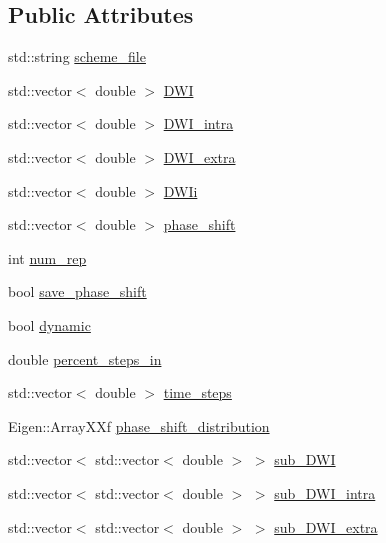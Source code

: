 \subsection*{Public Attributes}
\begin{DoxyCompactItemize}
\item 
std\+::string \hyperlink{class_simulable_sequence_a9898335af9d8f639f65b73eeac8efb53}{scheme\+\_\+file}
\item 
std\+::vector$<$ double $>$ \hyperlink{class_simulable_sequence_a083961d839ed1433206ccbc481996409}{D\+WI}
\item 
std\+::vector$<$ double $>$ \hyperlink{class_simulable_sequence_ac64fb8110b769e180283365567bd4158}{D\+W\+I\+\_\+intra}
\item 
std\+::vector$<$ double $>$ \hyperlink{class_simulable_sequence_a49a24269e364bcd02000ba575acc85ed}{D\+W\+I\+\_\+extra}
\item 
std\+::vector$<$ double $>$ \hyperlink{class_simulable_sequence_a3708afa1322d72b59d3be20b740d107c}{D\+W\+Ii}
\item 
std\+::vector$<$ double $>$ \hyperlink{class_simulable_sequence_a8691c0451c305869064862e30986c34c}{phase\+\_\+shift}
\item 
int \hyperlink{class_simulable_sequence_aa524c45db6c27dd21acacf97d7951ac2}{num\+\_\+rep}
\item 
bool \hyperlink{class_simulable_sequence_aa29f58ae224d92dd467a0845bd207324}{save\+\_\+phase\+\_\+shift}
\item 
bool \hyperlink{class_simulable_sequence_a1de2d00a939f550af1947ae25acc4b97}{dynamic}
\item 
double \hyperlink{class_simulable_sequence_a43e046af3bf6c498a5ad232058de8a90}{percent\+\_\+steps\+\_\+in}
\item 
std\+::vector$<$ double $>$ \hyperlink{class_simulable_sequence_a7e7e1a0de6045046061ffccaba4fa5ee}{time\+\_\+steps}
\item 
Eigen\+::\+Array\+X\+Xf \hyperlink{class_simulable_sequence_a4e45e2d935a05a7375b04718a49c9af7}{phase\+\_\+shift\+\_\+distribution}
\item 
std\+::vector$<$ std\+::vector$<$ double $>$ $>$ \hyperlink{class_simulable_sequence_a2686ccfa89396eeadd0a0d4f7842623c}{sub\+\_\+\+D\+WI}
\item 
std\+::vector$<$ std\+::vector$<$ double $>$ $>$ \hyperlink{class_simulable_sequence_a20a947108c3bb80ed45dd8851e777511}{sub\+\_\+\+D\+W\+I\+\_\+intra}
\item 
std\+::vector$<$ std\+::vector$<$ double $>$ $>$ \hyperlink{class_simulable_sequence_ad7157eed5b79cf74c45b4185a2465eb6}{sub\+\_\+\+D\+W\+I\+\_\+extra}

\end{DoxyCompactItemize}
